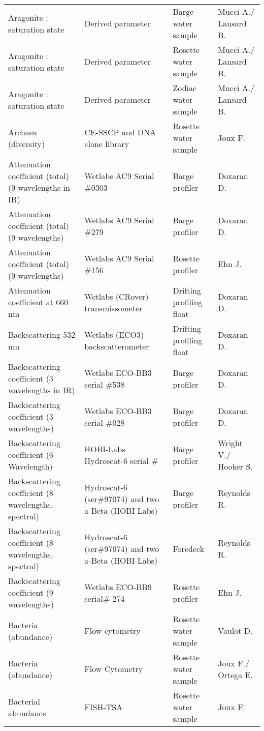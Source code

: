 \begin{longtable}[t]{llll}
Aragonite : saturation state & Derived parameter & Barge water sample & Mucci A./ Lansard B.\\
Aragonite : saturation state & Derived parameter & Rosette water sample & Mucci A./ Lansard B.\\
Aragonite : saturation state & Derived parameter & Zodiac water sample & Mucci A./ Lansard B.\\
\addlinespace
Archaea (diversity) & CE-SSCP and DNA clone library & Rosette water sample & Joux F.\\
Attenuation coefficient (total) (9 wavelengths in IR) & Wetlabs AC9 Serial \#0303 & Barge profiler & Doxaran D.\\
Attenuation coefficient (total) (9 wavelengths) & Wetlabs AC9 Serial \#279 & Barge profiler & Doxaran D.\\
Attenuation coefficient (total) (9 wavelengths) & Wetlabs AC9 Serial \#156 & Rosette profiler & Ehn J.\\
Attenuation coefficient at 660 nm & Wetlabs (CRover) transmissometer & Drifting profiling float & Doxaran D.\\
\addlinespace
Backscattering 532 nm & Wetlabs (ECO3) backscatterometer & Drifting profiling float & Doxaran D.\\
Backscattering coefficient (3 wavelengths in IR) & Wetlabs ECO-BB3 serial \#538 & Barge profiler & Doxaran D.\\
Backscattering coefficient (3 wavelengths) & Wetlabs ECO-BB3 serial \#028 & Barge profiler & Doxaran D.\\
Backscattering coefficient (6 Wavelength) & HOBI-Labs Hydroscat-6 serial \# & Barge profiler & Wright V./ Hooker S.\\
Backscattering coefficient (8 wavelengths, spectral) & Hydroscat-6 (ser\#97074) and two a-Beta (HOBI-Labs) & Barge profiler & Reynolds R.\\
\addlinespace
Backscattering coefficient (8 wavelengths, spectral) & Hydroscat-6 (ser\#97074) and two a-Beta (HOBI-Labs) & Foredeck & Reynolds R.\\
Backscattering coefficient (9 wavelengths) & Wetlabs ECO-BB9 serial\# 274 & Rosette profiler & Ehn J.\\
Bacteria (abundance) & Flow cytometry & Rosette water sample & Vaulot D.\\
Bacteria (abundance) & Flow Cytometry & Rosette water sample & Joux F./ Ortega E.\\
Bacterial abundance & FISH-TSA & Rosette water sample & Joux F.\\

\end{longtable}
